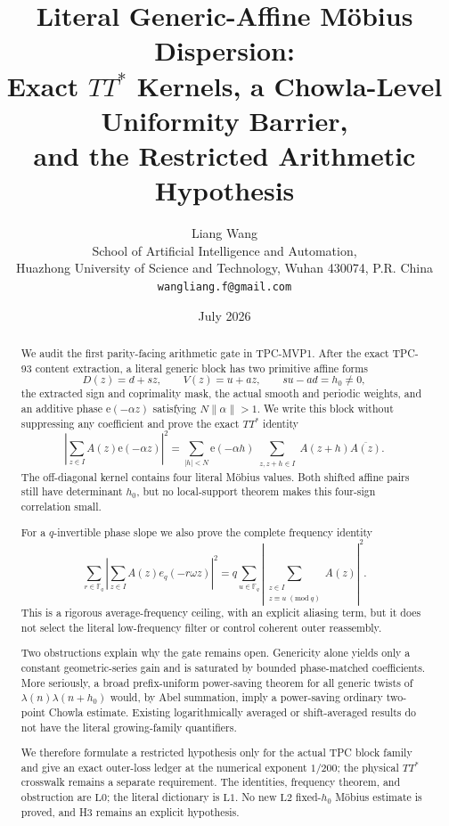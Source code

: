 \documentclass[11pt]{article}
\title{Literal Generic-Affine M\"obius Dispersion:\\
Exact \(TT^*\) Kernels, a Chowla-Level Uniformity Barrier,\\
and the Restricted Arithmetic Hypothesis}
\author{Liang Wang\\
School of Artificial Intelligence and Automation,\\
Huazhong University of Science and Technology, Wuhan 430074, P.R. China\\
\texttt{wangliang.f@gmail.com}}
\date{July 2026}
\theoremstyle{definition}
\theoremstyle{remark}
\newcommand{\F}{\mathbb F}
\newcommand{\Lzero}{\mathrm{L0}}
\newcommand{\Lone}{\mathrm{L1}}
\newcommand{\Ltwo}{\mathrm{L2}}
\newcommand{\e}{\mathrm e}
\begin{document}
\maketitle

\begin{abstract}
We audit the first parity-facing arithmetic gate in TPC-MVP1.
After the exact TPC-93 content extraction, a literal generic block
has two primitive affine forms
\[
 D(z)=d+sz,\qquad V(z)=u+az,\qquad su-ad=h_0\ne0,
\]
the extracted sign and coprimality mask, the actual smooth and
periodic weights, and an additive phase
\(\e(-\alpha z)\) satisfying \(N\|\alpha\|>1\).  We write this
block without suppressing any coefficient and prove the exact
\(TT^*\) identity
\[
 \left|\sum_{z\in I}A(z)\e(-\alpha z)\right|^2
 =
 \sum_{|h|<N}\e(-\alpha h)
 \sum_{\substack{z,z+h\in I}}
 A(z+h)\overline{A(z)}.
\]
The off-diagonal kernel contains four literal M\"obius values.
Both shifted affine pairs still have determinant \(h_0\), but no
local-support theorem makes this four-sign correlation small.

For a \(q\)-invertible phase slope we also prove the complete
frequency identity
\[
 \sum_{r\in\F_q}
 \left|\sum_{z\in I}A(z)e_q(-r\omega z)\right|^2
 =
 q\sum_{u\in\F_q}
 \left|\sum_{\substack{z\in I\\z\equiv u\;(\mathrm{mod}\ q)}}
 A(z)\right|^2.
\]
This is a rigorous average-frequency ceiling, with an explicit
aliasing term, but it does not select the literal low-frequency
filter or control coherent outer reassembly.

Two obstructions explain why the gate remains open.  Genericity
alone yields only a constant geometric-series gain and is saturated
by bounded phase-matched coefficients.  More seriously, a broad
prefix-uniform power-saving theorem for all generic twists of
\(\lambda(n)\lambda(n+h_0)\) would, by Abel summation, imply a
power-saving ordinary two-point Chowla estimate.  Existing
logarithmically averaged or shift-averaged results do not have the
literal growing-family quantifiers.

We therefore formulate a restricted hypothesis only for the actual
TPC block family and give an exact outer-loss ledger at the numerical
exponent \(1/200\); the physical \(TT^*\) crosswalk remains a
separate requirement.  The identities,
frequency theorem, and obstruction are \(\Lzero\); the literal
dictionary is \(\Lone\).  No new \(\Ltwo\) fixed-\(h_0\) M\"obius
estimate is proved, and H3 remains an explicit hypothesis.
\end{abstract}
\end{document}
